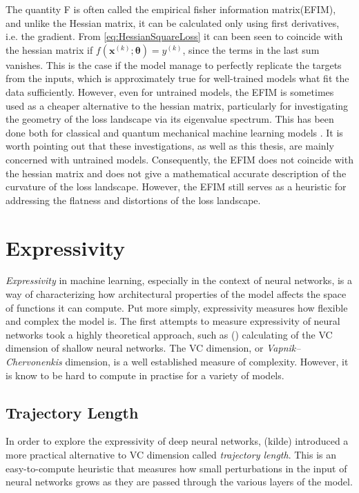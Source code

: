 The quantity F is often called the empirical fisher information matrix(EFIM)\cite{karakida2019universal}, and unlike the Hessian matrix, it can be calculated only using first derivatives, i.e. the gradient.
From \autoref{eq:HessianSquareLoss} it can been seen to coincide with the hessian matrix if $f(\boldsymbol{x}^{(k)};\boldsymbol{\theta}) = y^{(k)}$, since the terms in the last sum vanishes. This is the case if the model manage to perfectly replicate the targets from the inputs, which is approximately true for well-trained models what fit the data sufficiently. However, even for untrained models, the EFIM is sometimes used as a cheaper alternative to the hessian matrix, particularly for investigating the geometry of the loss landscape via its eigenvalue spectrum. This has been done both for classical and quantum mechanical machine learning models \cite{karakida2019universal} \cite{abbas2020power}. It is worth pointing out that these investigations, as well as this thesis, are mainly concerned with untrained models. Consequently, the EFIM does not coincide with the hessian matrix and does not give a mathematical accurate description of the curvature of the loss landscape. However, the EFIM still serves as a heuristic for addressing the flatness and distortions of the loss landscape. 

\section{Expressivity}\label{sec:Expressivity}
\emph{Expressivity} in machine learning, especially in the context of neural networks, is a way of characterizing how architectural properties of the model affects the space of functions it can compute. Put more simply, expressivity measures how flexible and complex the model is. The first attempts to measure expressivity of neural networks took a highly theoretical approach, such as () calculating of the VC dimension of shallow neural networks. The VC dimension, or \emph{Vapnik–Chervonenkis} dimension, is a well established measure of complexity. However, it is know to be hard to compute in practise for a variety of models\cite{abbas2020power}.  

\subsection{Trajectory Length}\label{sec:TrajectoryLength}
In order to explore the expressivity of deep neural networks, (kilde) introduced a more practical alternative to VC dimension called \emph{trajectory length}. This is an easy-to-compute heuristic that measures how small perturbations in the input of neural networks grows as they are passed through the various layers of the model. 

